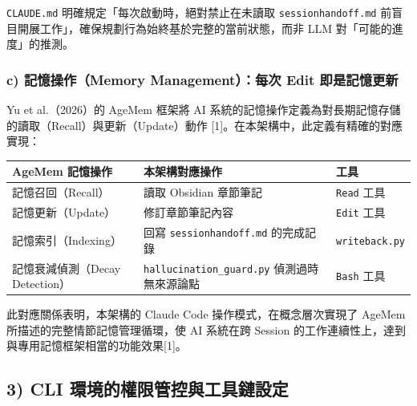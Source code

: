 \texttt{CLAUDE.md} 明確規定「每次啟動時，絕對禁止在未讀取
\texttt{sessionhandoff.md}
前盲目開展工作」，確保規劃行為始終基於完整的當前狀態，而非 LLM
對「可能的進度」的推測。

\subsubsection{c) 記憶操作（Memory Management）：每次 Edit
即是記憶更新}\label{c-ux8a18ux61b6ux64cdux4f5cmemory-managementux6bcfux6b21-edit-ux5373ux662fux8a18ux61b6ux66f4ux65b0}

Yu et al.（2026）的 AgeMem 框架將 AI
系統的記憶操作定義為對長期記憶存儲的讀取（Recall）與更新（Update）動作
{[}1{]}。在本架構中，此定義有精確的對應實現：

{\def\LTcaptype{none} %
\begin{longtable}[]{@{}
  >{\raggedright\arraybackslash}p{}
  >{\raggedright\arraybackslash}p{}
  >{\raggedright\arraybackslash}p{}@{}}
\toprule\noalign{}
\begin{minipage}[b]{\linewidth}\raggedright
AgeMem 記憶操作
\end{minipage} & \begin{minipage}[b]{\linewidth}\raggedright
本架構對應操作
\end{minipage} & \begin{minipage}[b]{\linewidth}\raggedright
工具
\end{minipage} \\
\midrule\noalign{}
\endhead
\bottomrule\noalign{}
\endlastfoot
記憶召回（Recall） & 讀取 Obsidian 章節筆記 & \texttt{Read} 工具 \\
記憶更新（Update） & 修訂章節筆記內容 & \texttt{Edit} 工具 \\
記憶索引（Indexing） & 回寫 \texttt{sessionhandoff.md} 的完成記錄 &
\texttt{writeback.py} \\
記憶衰減偵測（Decay Detection） & \texttt{hallucination\_guard.py}
偵測過時無來源論點 & \texttt{Bash} 工具 \\
\end{longtable}
}

此對應關係表明，本架構的 Claude Code 操作模式，在概念層次實現了 AgeMem
所描述的完整情節記憶管理循環，使 AI 系統在跨 Session
的工作連續性上，達到與專用記憶框架相當的功能效果{[}1{]}。

\subsection{3) CLI
環境的權限管控與工具鏈設定}\label{cli-ux74b0ux5883ux7684ux6b0aux9650ux7ba1ux63a7ux8207ux5de5ux5177ux93c8ux8a2dux5b9a}

